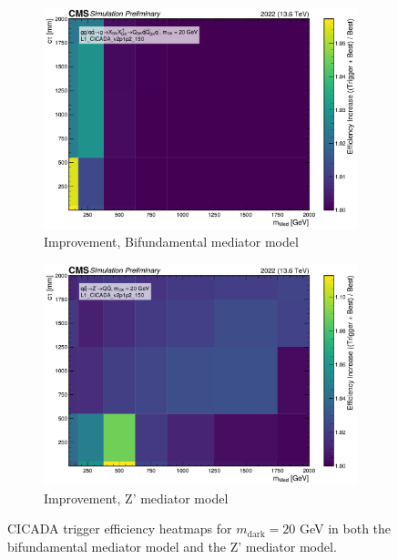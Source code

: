 \begin{figure}[h]
  \vspace{1em}

  \begin{subfigure}[t]{0.45\textwidth}
    \centering
    \includegraphics[width=\linewidth]{images/L1/ad_2D_tchan/trigeffplots2D_L1_efftype-improv_t-channel_mDark-20_L1_CICADA_v2p1p2_150_study_cloppear.pdf}
    \caption{Improvement, Bifundamental mediator model}
    \label{fig:cicada_improv_tchan}
  \end{subfigure}
  \hfill
  \begin{subfigure}[t]{0.45\textwidth}
    \centering
    \includegraphics[width=\linewidth]{images/L1/ad_2D_schan/trigeffplots2D_L1_efftype-improv_s-channel_mDark-20_L1_CICADA_v2p1p2_150_study_cloppear.pdf}
    \caption{Improvement, Z' mediator model}
    \label{fig:cicada_improv_schan}
  \end{subfigure}

  \caption{CICADA trigger efficiency heatmaps for $m_\mathrm{dark} = 20$ GeV in both the bifundamental mediator model and the Z' mediator model.}
  \label{fig:cicada_eff}
\end{figure}

